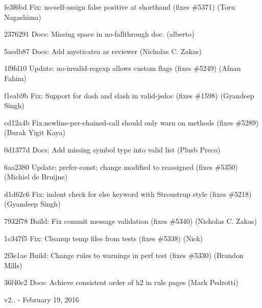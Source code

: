 \begin{DoxyItemize}
\item fe3f6bd Fix\+: {\ttfamily no-\/self-\/assign} false positive at shorthand (fixes \#5371) (Toru Nagashima)
\item 2376291 Docs\+: Missing space in {\ttfamily no-\/fallthrough} doc. (alberto)
\item 5aedb87 Docs\+: Add mysticatea as reviewer (Nicholas C. Zakas)
\item 1f9fd10 Update\+: no-\/invalid-\/regexp allows custom flags (fixes \#5249) (Afnan Fahim)
\item f1eab9b Fix\+: Support for dash and slash in {\ttfamily valid-\/jsdoc} (fixes \#1598) (Gyandeep Singh)
\item cd12a4b Fix\+:{\ttfamily newline-\/per-\/chained-\/call} should only warn on methods (fixes \#5289) (Burak Yigit Kaya)
\item 0d1377d Docs\+: Add missing {\ttfamily symbol} type into valid list (Plusb Preco)
\item 6aa2380 Update\+: prefer-\/const; change modified to reassigned (fixes \#5350) (Michiel de Bruijne)
\item d1d62c6 Fix\+: indent check for else keyword with Stroustrup style (fixes \#5218) (Gyandeep Singh)
\item 7932f78 Build\+: Fix commit message validation (fixes \#5340) (Nicholas C. Zakas)
\item 1c347f5 Fix\+: Cleanup temp files from tests (fixes \#5338) (Nick)
\item 2f3e1ae Build\+: Change rules to warnings in perf test (fixes \#5330) (Brandon Mills)
\item 36f40c2 Docs\+: Achieve consistent order of h2 in rule pages (Mark Pedrotti)
\end{DoxyItemize}

v2.. -\/ February 19, 2016


